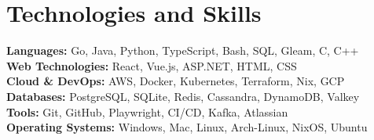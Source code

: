 \documentclass[10pt,a4paper]{article}
\begin{document}
	\section{Technologies and Skills}
	\textbf{Languages:} Go, Java, Python, TypeScript, Bash, SQL, Gleam, C, C++ \\
	\textbf{Web Technologies:} React, Vue.js, ASP.NET, HTML, CSS \\
	\textbf{Cloud \& DevOps:} AWS, Docker, Kubernetes, Terraform, Nix, GCP \\
	\textbf{Databases:} PostgreSQL, SQLite, Redis, Cassandra, DynamoDB, Valkey \\
	\textbf{Tools:} Git, GitHub, Playwright, CI/CD, Kafka, Atlassian \\
	\textbf{Operating Systems:} Windows, Mac, Linux, Arch-Linux, NixOS, Ubuntu
	
\end{document}
